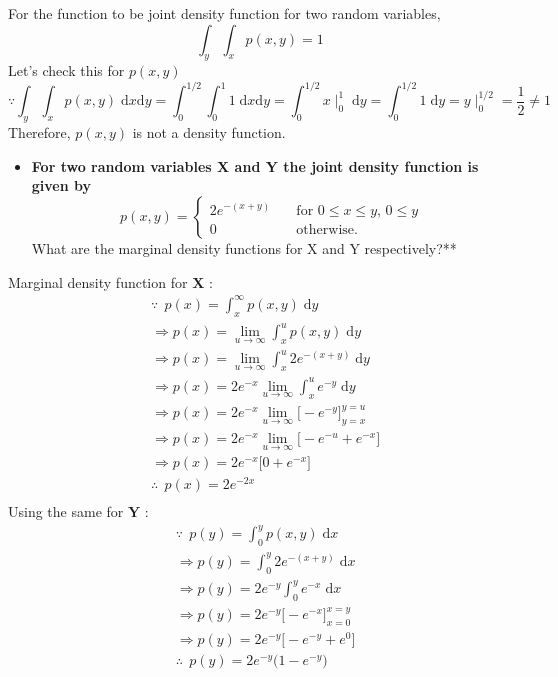 \documentclass[11pt]{article}
\providecommand{\tightlist}{%
      \setlength{\itemsep}{0pt}\setlength{\parskip}{0pt}}
\begin{document}
    For the function to be joint density function for two random variables,
\[
\int_y \int_x p(x, y) =1
\] Let's check this for \(p(x, y)\) \[
\because \int_y \int_x p(x, y)\; \mathrm{d}x \mathrm{d}y = \int_0^{1/2} \int_0^1 1\; \mathrm{d}x \mathrm{d}y = \int_0^{1/2} x\mid_0^1\; \mathrm{d}y = \int_0^{1/2} 1\; \mathrm{d}y = y\mid_0^{1/2} = \frac{1}{2} \neq 1
\] Therefore, \(p(x, y)\) is not a density function.

    \begin{itemize}
\tightlist
\item
  \textbf{For two random variables X and Y the joint density function is
  given by \[
  p(x, y) = \begin{cases}
  2\mathit{e}^{-(x+y)} & \quad \text{for } 0\leq x\leq y\text{, } 0\leq y \\
  0 & \quad \text{otherwise.} \end{cases}
  \] }What are the marginal density functions for X and Y
  respectively?**
\end{itemize}

    Marginal density function for \(\mathbf{X}\) : \[
\begin{align*}
& \because \,\; p(x) = \int_x^\infty p(x, y)\; \mathrm{d}y\\
& \Rightarrow p(x) = \lim_{u\to\infty} \int_x^u p(x, y)\; \mathrm{d}y\\
& \Rightarrow p(x) = \lim_{u\to\infty} \int_x^u 2e^{-(x+y)}\; \mathrm{d}y\\
& \Rightarrow p(x) = 2e^{-x} \lim_{u\to\infty} \int_x^u e^{-y}\; \mathrm{d}y\\
& \Rightarrow p(x) = 2e^{-x} \lim_{u\to\infty} \big[-e^{-y}\big]_{y=x}^{y=u}\\
& \Rightarrow p(x) = 2e^{-x} \lim_{u\to\infty} \big[-e^{-u}+e^{-x}\big]\\
& \Rightarrow p(x) = 2e^{-x} \big[0+e^{-x}\big]\\
& \therefore \,\; p(x) = 2e^{-2x}\\
\end{align*}
\] Using the same for \(\mathbf{Y}\) : \[
\begin{align*}
& \because \,\; p(y) = \int_0^y p(x, y)\; \mathrm{d}x\\
& \Rightarrow p(y) = \int_0^y 2e^{-(x+y)}\; \mathrm{d}x\\
& \Rightarrow p(y) = 2e^{-y} \int_0^y e^{-x}\; \mathrm{d}x\\
& \Rightarrow p(y) = 2e^{-y} \big[ -e^{-x} \big]_{x=0}^{x=y}\\
& \Rightarrow p(y) = 2e^{-y} \big[ -e^{-y} + e^0 \big]\\
& \therefore \,\; p(y) = 2e^{-y} \big( 1 - e^{-y} \big)\\
\end{align*}
\]
\end{document}
